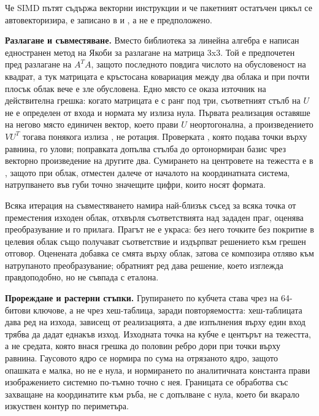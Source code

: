 Че SIMD пътят съдържа векторни инструкции и че пакетният остатъчен цикъл се автовекторизира,
е записано в  и
, а не е предположено.

\textbf{Разлагане и съвместяване.} Вместо библиотека за линейна алгебра е написан едностранен
метод на Якоби за разлагане на матрица 3x3. Той е предпочетен пред разлагане на $A^{T}A$, защото
последното повдига числото на обусловеност на квадрат, а тук матрицата е кръстосана ковариация
между два облака и при почти плосък облак вече е зле обусловена. Едно място се оказа източник
на действителна грешка: когато матрицата е с ранг под три, съответният стълб на
$U$ не е определен от входа и нормата му излиза нула. Първата реализация оставяше на негово
място единичен вектор, което прави $U$ неортогонална, а произведението $VU^{T}$ тогава понякога
излиза , не ротация. Проверката
, която подава точки върху равнина, го улови;
поправката допълва стълба до ортонормиран базис чрез векторно произведение на другите два.
Сумирането на центровете на тежестта е в , защото при облак, отместен далече от
началото на координатната система, натрупването във  губи точно значещите цифри,
които носят формата.

Всяка итерация на съвместяването намира най-близък съсед за всяка точка от преместения изходен
облак, отхвърля съответствията над зададен праг, оценява преобразувание и го прилага. Прагът не
е украса: без него точките без покритие в целевия облак също получават съответствие и издърпват
решението към грешен отговор. Оценената добавка се смята върху  облак,
затова се композира отляво към натрупаното преобразувание; обратният ред дава решение, което
изглежда правдоподобно, но не съвпада с еталона.

\textbf{Прореждане и растерни стъпки.} Групирането по кубчета става чрез  на
64-битови ключове, а не чрез хеш-таблица, заради повторяемостта: хеш-таблицата дава ред на
изхода, зависещ от реализацията, а две изпълнения върху един вход трябва да дадат еднакъв изход.
Изходната точка на кубче е центърът на тежестта, а не средата, която внася грешка до половин
ребро дори при точки върху равнина. Гаусовото ядро се нормира по  сума на
отрязаното ядро, защото опашката е малка, но не е нула, и нормирането по аналитичната константа
прави изображението системно по-тъмно точно с нея. Границата се обработва със захващане на
координатите към ръба, не с допълване с нула, което би вкарало изкуствен контур по периметъра.
